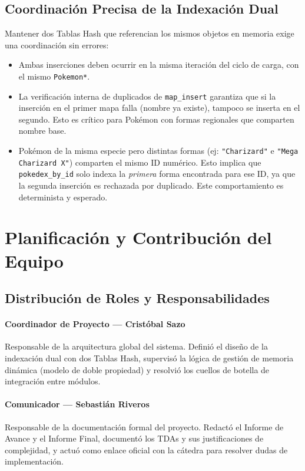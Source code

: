 \documentclass[12pt, letterpaper]{article}
\begin{document}
\subsection{Coordinación Precisa de la Indexación Dual}

Mantener dos Tablas Hash que referencian los mismos objetos en memoria exige una coordinación sin errores:
\begin{itemize}
    \item Ambas inserciones deben ocurrir en la misma iteración del ciclo de carga, con el mismo \texttt{Pokemon*}.
    \item La verificación interna de duplicados de \texttt{map\_insert} garantiza que si la inserción en el primer mapa falla (nombre ya existe), tampoco se inserta en el segundo. Esto es crítico para Pokémon con formas regionales que comparten nombre base.
    \item Pokémon de la misma especie pero distintas formas (ej: \texttt{"Charizard"} e \texttt{"Mega Charizard X"}) comparten el mismo ID numérico. Esto implica que \texttt{pokedex\_by\_id} solo indexa la \emph{primera} forma encontrada para ese ID, ya que la segunda inserción es rechazada por duplicado. Este comportamiento es determinista y esperado.
\end{itemize}

\section{Planificación y Contribución del Equipo}

\subsection{Distribución de Roles y Responsabilidades}

\paragraph{Coordinador de Proyecto --- Cristóbal Sazo}
Responsable de la arquitectura global del sistema. Definió el diseño de la indexación dual con dos Tablas Hash, supervisó la lógica de gestión de memoria dinámica (modelo de doble propiedad) y resolvió los cuellos de botella de integración entre módulos.

\paragraph{Comunicador --- Sebastián Riveros}
Responsable de la documentación formal del proyecto. Redactó el Informe de Avance y el Informe Final, documentó los TDAs y sus justificaciones de complejidad, y actuó como enlace oficial con la cátedra para resolver dudas de implementación.
\end{document}
